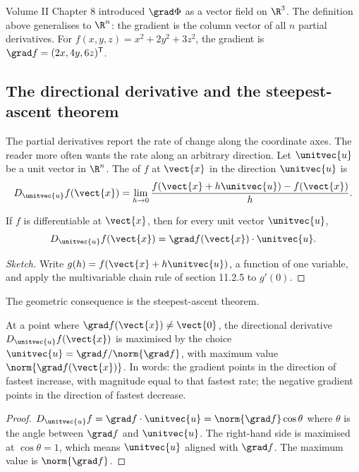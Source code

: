 Volume II Chapter 8 introduced $\grad\Phi$ as a vector field on
$\R^{3}$. The definition above generalises to $\R^{n}$: the gradient
is the column vector of all $n$ partial derivatives. For
$f(x, y, z) = x^{2} + 2 y^{2} + 3 z^{2}$, the gradient is $\grad f =
(2x, 4y, 6z)^{\mathsf{T}}$.

\subsection{The directional derivative and the steepest-ascent
theorem}

The partial derivatives report the rate of change along the
coordinate axes. The reader more often wants the rate along an
arbitrary direction. Let $\unitvec{u}$ be a unit vector in $\R^{n}$.
The  of $f$ at $\vect{x}$ in the
direction $\unitvec{u}$ is
\[
D_{\unitvec{u}} f(\vect{x}) = \lim_{h \to 0}
\frac{f(\vect{x} + h\unitvec{u}) - f(\vect{x})}{h}.
\]

\begin{theorem}
If $f$ is differentiable at $\vect{x}$, then for every unit vector
$\unitvec{u}$,
\[
D_{\unitvec{u}} f(\vect{x}) = \grad f(\vect{x}) \cdot \unitvec{u}.
\]
\end{theorem}

\begin{proof}[Sketch]
Write $g(h) = f(\vect{x} + h \unitvec{u})$, a function of one
variable, and apply the multivariable chain rule of section 11.2.5
to $g'(0)$.
\end{proof}

The geometric consequence is the steepest-ascent theorem.

\begin{principle}
At a point where $\grad f(\vect{x}) \neq \vect{0}$, the directional
derivative $D_{\unitvec{u}} f(\vect{x})$ is maximised by the choice
$\unitvec{u} = \grad f / \norm{\grad f}$, with maximum value
$\norm{\grad f(\vect{x})}$. In words: the gradient points in the
direction of fastest increase, with magnitude equal to that fastest
rate; the negative gradient points in the direction of fastest
decrease.
\end{principle}

\begin{proof}
$D_{\unitvec{u}} f = \grad f \cdot \unitvec{u} = \norm{\grad f}
\cos\theta$ where $\theta$ is the angle between $\grad f$ and
$\unitvec{u}$. The right-hand side is maximised at $\cos\theta = 1$,
which means $\unitvec{u}$ aligned with $\grad f$. The maximum value
is $\norm{\grad f}$.
\end{proof}

